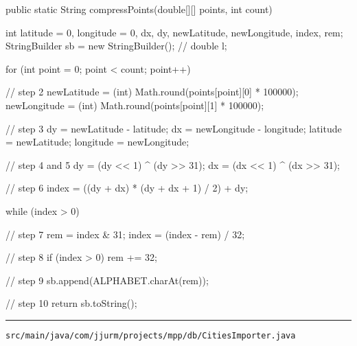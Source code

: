 \begin{javacode}
{  public static String compressPoints(double[][] points, int count) {
    int latitude = 0, longitude = 0, dx, dy, newLatitude, newLongitude, index, rem;
    StringBuilder sb = new StringBuilder();
    // double l;

    for (int point = 0; point < count; point++) {

      // step 2
      newLatitude = (int) Math.round(points[point][0] * 100000);
      newLongitude = (int) Math.round(points[point][1] * 100000);

      // step 3
      dy = newLatitude - latitude;
      dx = newLongitude - longitude;
      latitude = newLatitude;
      longitude = newLongitude;

      // step 4 and 5
      dy = (dy << 1) ^ (dy >> 31);
      dx = (dx << 1) ^ (dx >> 31);

      // step 6
      index = ((dy + dx) * (dy + dx + 1) / 2) + dy;

      while (index > 0) {

        // step 7
        rem = index & 31;
        index = (index - rem) / 32;

        // step 8
        if (index > 0)
          rem += 32;

        // step 9
        sb.append(ALPHABET.charAt(rem));
      }
    }

    // step 10
    return sb.toString();
  }

}
\end{javacode}

\noindent\rule{\textwidth}{0.4pt}

\nointerlineskip
\texttt{src/main/java/com/jjurm/projects/mpp/db/CitiesImporter.java}

